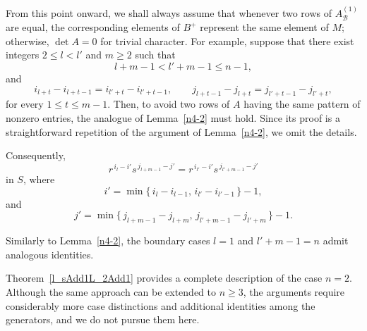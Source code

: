 \documentclass[11pt,reqno]{amsart}
\theoremstyle{plain}
\theoremstyle{remark}
\theoremstyle{definition}
\begin{document}

From this point onward, we shall always assume that whenever two rows of $A^{(1)}_{\mathcal{B}}$ are equal, the corresponding elements of $B^+$ represent the same element of $M$; otherwise, $\det A=0$ for trivial character.
For example, suppose that there exist integers $2\le l<l'$ and $m\ge2$ such that
\[
l+m-1<l'+m-1\le n-1,
\]
and
\[
i_{l+t}-i_{l+t-1}=i_{l'+t}-i_{l'+t-1},
\qquad
j_{l+t-1}-j_{l+t}=j_{l'+t-1}-j_{l'+t},
\]
for every $1\le t\le m-1$. Then, to avoid two rows of $A$ having the same pattern of nonzero entries, the analogue of Lemma~\ref{n4-2} must hold. Since its proof is a straightforward repetition of the argument of Lemma~\ref{n4-2}, we omit the details.

Consequently,
\[
r^{\,i_l-i'}s^{\,j_{l+m-1}-j'}
=
r^{\,i_{l'}-i'}s^{\,j_{l'+m-1}-j'}
\]
in $S$, where
\[
i'
=
\min\{\,i_l-i_{l-1},\, i_{l'}-i_{l'-1}\,\}-1,
\]
and
\[
j'
=
\min\{\,j_{l+m-1}-j_{l+m},\, j_{l'+m-1}-j_{l'+m}\,\}-1.
\]

Similarly to Lemma~\ref{n4-2}, the boundary cases $l=1$ and $l'+m-1=n$ admit analogous identities. 

Theorem~\ref{l_sAdd1L_2Add1} provides a complete description of the case $n=2$. Although the same approach can be extended to $n\ge3$, the arguments require considerably more case distinctions and additional identities among the generators, and we do not pursue them here.

\end{document}
